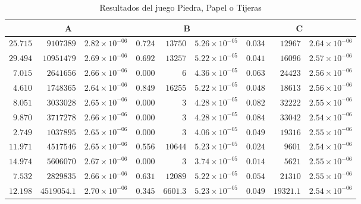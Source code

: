\begin{table}[ht]
    \scriptsize
    \centering
    \begin{tabular}{r r r | r r r | r r r}
    \multicolumn{3}{c}{A} & \multicolumn{3}{c}{B} & \multicolumn{3}{c}{C} \\ \hline
    $25.715$ & $9107389$ & $2.82 {\times} 10^{-06}$ & $0.724$ & $13750$ & $5.26 {\times} 10^{-05}$ & $0.034$ & $12967$ & $2.64 {\times} 10^{-06}$ \\
    $29.494$ & $10951479$ & $2.69 {\times} 10^{-06}$ & $0.692$ & $13257$ & $5.22 {\times} 10^{-05}$ & $0.041$ & $16096$ & $2.57 {\times} 10^{-06}$ \\
    $7.015$ & $2641656$ & $2.66 {\times} 10^{-06}$ & $0.000$ & $6$ & $4.36 {\times} 10^{-05}$ & $0.063$ & $24423$ & $2.56 {\times} 10^{-06}$ \\
    $4.610$ & $1748365$ & $2.64 {\times} 10^{-06}$ & $0.849$ & $16255$ & $5.22 {\times} 10^{-05}$ & $0.048$ & $18613$ & $2.56 {\times} 10^{-06}$ \\
    $8.051$ & $3033028$ & $2.65 {\times} 10^{-06}$ & $0.000$ & $3$ & $4.28 {\times} 10^{-05}$ & $0.082$ & $32222$ & $2.55 {\times} 10^{-06}$ \\
    $9.870$ & $3717278$ & $2.66 {\times} 10^{-06}$ & $0.000$ & $3$ & $4.28 {\times} 10^{-05}$ & $0.084$ & $33042$ & $2.54 {\times} 10^{-06}$ \\
    $2.749$ & $1037895$ & $2.65 {\times} 10^{-06}$ & $0.000$ & $3$ & $4.06 {\times} 10^{-05}$ & $0.049$ & $19316$ & $2.55 {\times} 10^{-06}$ \\
    $11.971$ & $4517546$ & $2.65 {\times} 10^{-06}$ & $0.556$ & $10644$ & $5.23 {\times} 10^{-05}$ & $0.024$ & $9601$ & $2.54 {\times} 10^{-06}$ \\
    $14.974$ & $5606070$ & $2.67 {\times} 10^{-06}$ & $0.000$ & $3$ & $3.74 {\times} 10^{-05}$ & $0.014$ & $5621$ & $2.55 {\times} 10^{-06}$ \\
    $7.532$ & $2829835$ & $2.66 {\times} 10^{-06}$ & $0.631$ & $12089$ & $5.22 {\times} 10^{-05}$ & $0.054$ & $21310$ & $2.55 {\times} 10^{-06}$ \\ \hline
    $12.198$ & $4519054.1$ & $2.70 {\times} 10^{-06}$ & $0.345$ & $6601.3$ & $5.23 {\times} 10^{-05}$ & $0.049$ & $19321.1$ & $2.54 {\times} 10^{-06}$ \\ \hline
    \end{tabular}
    \caption{Resultados del juego Piedra, Papel o Tijeras}
    \label{tab:resultados-RPS}
\end{table}

